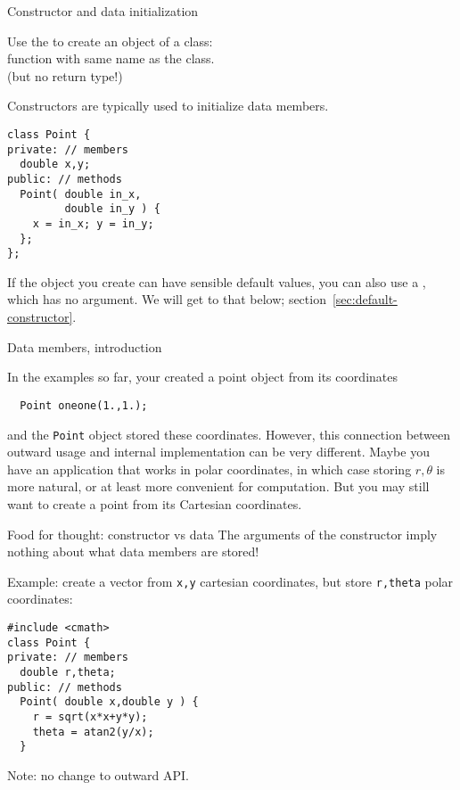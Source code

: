 \begin{slide}{Constructor and data initialization}
  \label{sl:class-construct}
\begin{tldr}
  Use the  to create an object of a class:\\
  function with same name as the class.\\
  (but no return type!)
\end{tldr}

  Constructors are typically used to initialize data members.
  \begin{multicols}{2}
\begin{lstlisting}
class Point {
private: // members
  double x,y;
public: // methods
  Point( double in_x,
         double in_y ) {
    x = in_x; y = in_y;
  };
};
\end{lstlisting}
\columnbreak
{}
\end{multicols}
\end{slide}

If the object you create can have sensible default values,
you can also use a ,
which has no argument.
We will get to that below; section~\ref{sec:default-constructor}.

 {Data members, introduction}

In the examples so far, your created a point object from its coordinates
\begin{lstlisting}
  Point oneone(1.,1.);
\end{lstlisting}
and the \lstinline{Point} object stored these coordinates.
However, this connection between outward usage and internal implementation
can be very different.
Maybe you have an application that works in polar coordinates,
in which case storing $r,\theta$ is more natural,
or at least more convenient for computation.
But you may still want to create a point from its Cartesian coordinates.

\begin{block}{Food for thought: constructor vs data}
  \label{sl:class-set}
  The arguments of the constructor imply nothing about
  what data members are stored!

  Example: create a vector from \lstinline{x,y} cartesian coordinates,
  but store \lstinline{r,theta} polar coordinates:

\begin{lstlisting}
#include <cmath>
class Point {
private: // members
  double r,theta;
public: // methods
  Point( double x,double y ) {
    r = sqrt(x*x+y*y);
    theta = atan2(y/x);
  }
\end{lstlisting}
Note: no change to outward API.
\end{block}

